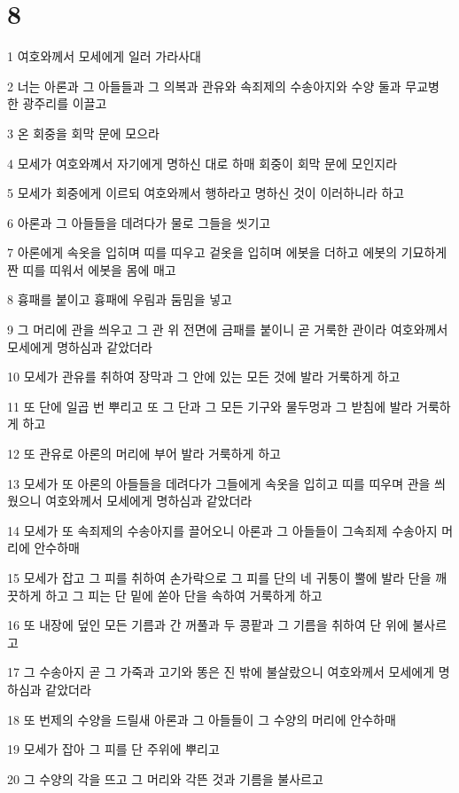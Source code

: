 \chapter{8}

\par 1 여호와께서 모세에게 일러 가라사대
\par 2 너는 아론과 그 아들들과 그 의복과 관유와 속죄제의 수송아지와 수양 둘과 무교병 한 광주리를 이끌고
\par 3 온 회중을 회막 문에 모으라
\par 4 모세가 여호와꼐서 자기에게 명하신 대로 하매 회중이 회막 문에 모인지라
\par 5 모세가 회중에게 이르되 여호와께서 행하라고 명하신 것이 이러하니라 하고
\par 6 아론과 그 아들들을 데려다가 물로 그들을 씻기고
\par 7 아론에게 속옷을 입히며 띠를 띠우고 겉옷을 입히며 에봇을 더하고 에봇의 기묘하게 짠 띠를 띠워서 에봇을 몸에 매고
\par 8 흉패를 붙이고 흉패에 우림과 둠밈을 넣고
\par 9 그 머리에 관을 씌우고 그 관 위 전면에 금패를 붙이니 곧 거룩한 관이라 여호와께서 모세에게 명하심과 같았더라
\par 10 모세가 관유를 취하여 장막과 그 안에 있는 모든 것에 발라 거룩하게 하고
\par 11 또 단에 일곱 번 뿌리고 또 그 단과 그 모든 기구와 물두멍과 그 받침에 발라 거룩하게 하고
\par 12 또 관유로 아론의 머리에 부어 발라 거룩하게 하고
\par 13 모세가 또 아론의 아들들을 데려다가 그들에게 속옷을 입히고 띠를 띠우며 관을 씌웠으니 여호와께서 모세에게 명하심과 같았더라
\par 14 모세가 또 속죄제의 수송아지를 끌어오니 아론과 그 아들들이 그속죄제 수송아지 머리에 안수하매
\par 15 모세가 잡고 그 피를 취하여 손가락으로 그 피를 단의 네 귀퉁이 뿔에 발라 단을 깨끗하게 하고 그 피는 단 밑에 쏟아 단을 속하여 거룩하게 하고
\par 16 또 내장에 덮인 모든 기름과 간 꺼풀과 두 콩팥과 그 기름을 취하여 단 위에 불사르고
\par 17 그 수송아지 곧 그 가죽과 고기와 똥은 진 밖에 불살랐으니 여호와께서 모세에게 명하심과 같았더라
\par 18 또 번제의 수양을 드릴새 아론과 그 아들들이 그 수양의 머리에 안수하매
\par 19 모세가 잡아 그 피를 단 주위에 뿌리고
\par 20 그 수양의 각을 뜨고 그 머리와 각뜬 것과 기름을 불사르고
